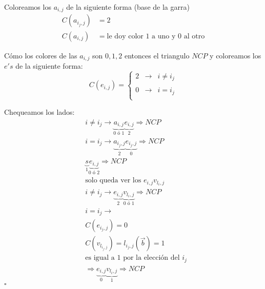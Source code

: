 \documentclass[12pt,a4paper]{article}
\begin{document}
Coloreamos los $a_{i,j}$ de la siguiente forma (base de la garra)
\begin{align*}
    C(a_{i_{j},j}) &= 2 \\
    C(a_{i,j}) &= \text{le doy color $1$ a uno y $0$ al otro}
\end{align*}

Cómo los colores de las $a_{i,j}$ son $0,1,2$ entonces el triangulo $NCP$ y coloreamos 
los $e's$ de la siguiente forma:
$$C(e_{i,j})= \left\{ \begin{array}{lcc}
    2 & \to & i \neq i_{j} \\
    \\ 0& \to & i = i_{j}\\
    \end{array}
    \right.$$

Chequeamos los lados:
\begin{align*}
    &i \neq i_{j} \to \underbrace{a_{i,j}}_{0\,\,\text{ó}\,\,1}\underbrace{e_{i,j}}_{2} \Rightarrow NCP \\
    &i = i_{j} \to \underbrace{a_{i_{j},j}}_{2}\underbrace{e_{i_{j},j}}_{0} \Rightarrow NCP \\
    &\underbrace{s}_{1}\underbrace{e_{i,j}}_{0\,\,\text{ó}\,\,2} \Rightarrow NCP \\
    &\text{solo queda ver los}\,\, e_{i,j}v_{l_{i},j}\\
    &i \neq i_{j} \to \underbrace{e_{i,j}}_{2}\underbrace{v_{l_{i},j}}_{0\,\,\text{ó}\,\,1} \Rightarrow NCP \\
    &i = i_{j} \to \\
    &C(e_{i_{j},j}) = 0\\
    &C(v_{{l_{i_{j},j}}}) = l_{i_{j},j}(\overrightarrow{b}) = 1\\
    &\text{es igual a $1$ por la elección del $i_{j}$}\\
    &\Rightarrow \underbrace{e_{i,j}}_{0}\underbrace{v_{l_{i},j}}_{1} \Rightarrow NCP
\end{align*}
$\square$
\end{document}
